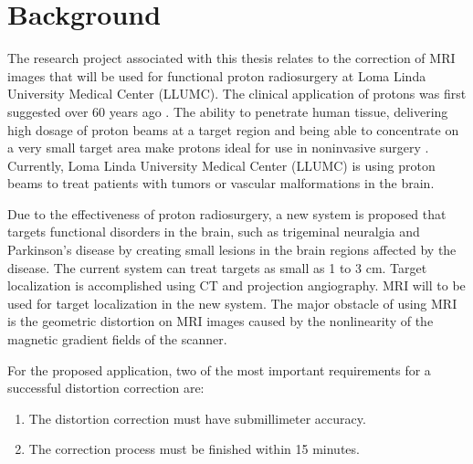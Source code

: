 \section{Background}

The research project associated with this thesis relates to the correction of MRI images that will be used
for functional proton radiosurgery at Loma Linda University Medical Center (LLUMC).
The clinical application of protons was first suggested over 60 years ago \cite{Wil46}.
The ability to penetrate human tissue, delivering high dosage of proton beams at a target
region and being able to concentrate on a very small target area make protons ideal for use in noninvasive
surgery \cite{Wil46}. Currently, Loma Linda University
Medical Center (LLUMC) is using proton beams to treat patients with tumors or
vascular malformations in the brain.

Due to the effectiveness of proton radiosurgery, a new system is proposed that targets functional
disorders in the brain, such as trigeminal neuralgia and Parkinson's disease by creating small lesions in
the brain regions affected by the disease.
The current system can treat targets as small as 1 to 3 cm.
Target localization is accomplished using CT and projection angiography.
MRI will to be used for target localization in the new system.
The major obstacle of using MRI is the geometric distortion on MRI images caused by the nonlinearity of the magnetic gradient fields of the scanner.

For the proposed application, two of the most important requirements for a successful distortion
correction are:
\begin{enumerate}
\item The distortion correction must have submillimeter accuracy.
\item The correction process must be finished within 15 minutes.
\end{enumerate}



